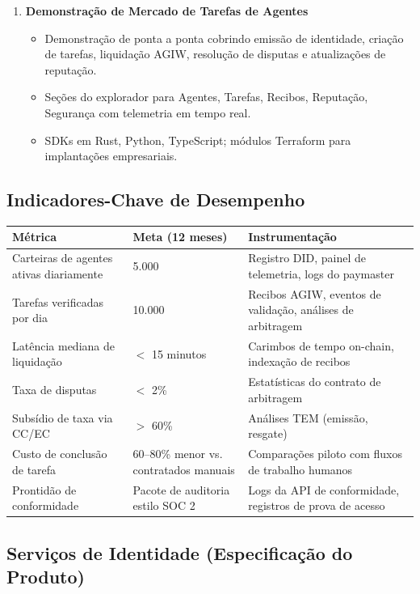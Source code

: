 \documentclass[11pt]{article}
\begin{document}
\begin{enumerate}[label=\textbf{D\arabic*.}, leftmargin=*]
\begin{itemize}[noitemsep]
  \end{itemize}
  \item \textbf{Demonstração de Mercado de Tarefas de Agentes}
  \begin{itemize}[noitemsep]
    \item Demonstração de ponta a ponta cobrindo emissão de identidade, criação de tarefas, liquidação AGIW, resolução de disputas e atualizações de reputação.
    \item Seções do explorador para Agentes, Tarefas, Recibos, Reputação, Segurança com telemetria em tempo real.
    \item SDKs em Rust, Python, TypeScript; módulos Terraform para implantações empresariais.
  \end{itemize}
\end{enumerate}

\subsection{Indicadores-Chave de Desempenho}
\begin{longtable}{@{}p{}p{}p{}@{}}
\toprule
\textbf{Métrica} & \textbf{Meta (12 meses)} & \textbf{Instrumentação} \\\midrule
Carteiras de agentes ativas diariamente & 5.000 & Registro DID, painel de telemetria, logs do paymaster \\
Tarefas verificadas por dia & 10.000 & Recibos AGIW, eventos de validação, análises de arbitragem \\
Latência mediana de liquidação & $<$ 15 minutos & Carimbos de tempo on-chain, indexação de recibos \\
Taxa de disputas & $<$ 2\% & Estatísticas do contrato de arbitragem \\
Subsídio de taxa via CC/EC & $>$ 60\% & Análises TEM (emissão, resgate) \\
Custo de conclusão de tarefa & 60--80\% menor vs. contratados manuais & Comparações piloto com fluxos de trabalho humanos \\
Prontidão de conformidade & Pacote de auditoria estilo SOC 2 & Logs da API de conformidade, registros de prova de acesso \\
\bottomrule
\end{longtable}

\subsection{Serviços de Identidade (Especificação do Produto)}
\label{sec:identity-spec}
\end{document}

